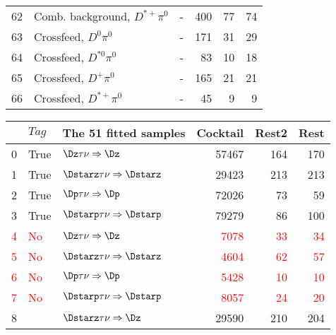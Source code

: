 \documentclass[6pt]{article}
\newcommand{\Red} [1]  {\textcolor{red}{#1}}
\begin{document}
\begin{tabular}{r l r r r r}
62   & Comb. background, $D^{*+} \pi^0$                       &  -            & 400     & 77      & 74     \\
63   & Crossfeed, $D^{0} \pi^0$                               &  -            & 171     & 31      & 29     \\
64   & Crossfeed, $D^{*0} \pi^0$                              &  -            & 83      & 10      & 18     \\
65   & Crossfeed, $D^{+} \pi^0$                               &  -            & 165     & 21      & 21     \\
66   & Crossfeed, $D^{*+} \pi^0$                              &  -            & 45      & 9       & 9      \\
\hline \hline 
\end{tabular}

\begin{tabular}{r l l r r r}\\ \hline\hline
    & $Tag$ & \multicolumn{1}{c}{\bf The 51 fitted samples}  &  Cocktail & Rest2 & Rest  \\ \hline
0   &  True  & $\Dz\tau\nu\Rightarrow\Dz$                             &  57467	     & 164      & 170       \\
1   &  True  & $\Dstarz\tau\nu\Rightarrow\Dstarz$                     &  29423	     & 213      & 213       \\
2   &  True  & $\Dp\tau\nu\Rightarrow\Dp$                             &  72026	     & 73       & 59        \\
3   &  True  & $\Dstarp\tau\nu\Rightarrow\Dstarp$                     &  79279	     & 86       & 100       \\
\Red{4}   &  \Red{No}   & \Red{$\Dz\tau\nu\Rightarrow\Dz$}                             &  \Red{7078}	     & \Red{33}       & \Red{34}        \\
\Red{5}   &  \Red{No}   & \Red{$\Dstarz\tau\nu\Rightarrow\Dstarz$}                     &  \Red{4604}	     & \Red{62}       & \Red{57}        \\
\Red{6}   &  \Red{No}   & \Red{$\Dp\tau\nu\Rightarrow\Dp$}                             &  \Red{5428}	     & \Red{10}       & \Red{10}        \\
\Red{7}   &  \Red{No}   & \Red{$\Dstarp\tau\nu\Rightarrow\Dstarp$}                     &  \Red{8057}	     & \Red{24}       & \Red{20}        \\
8   &       & $\Dstarz\tau\nu\Rightarrow\Dz$                         &  29590	     & 210      & 204       \\

\end{tabular}
\end{document}
